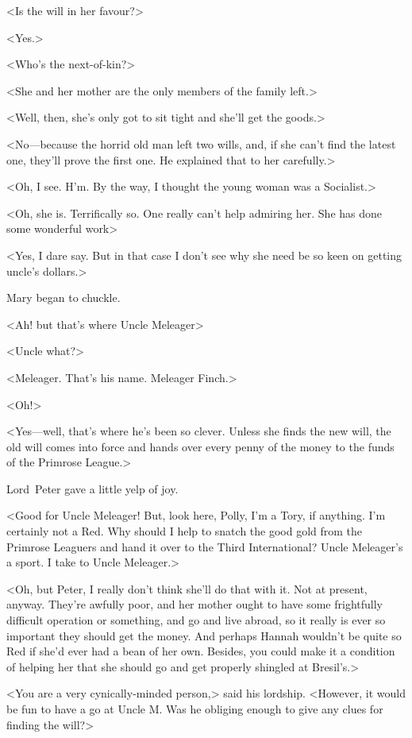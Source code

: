 <Is the will in her favour?>

<Yes.>

<Who's the next-of-kin?>

<She and her mother are the only members of the family left.>

<Well, then, she's only got to sit tight and she'll get the goods.>

<No—because the horrid old man left two wills, and, if she can't find the latest one, they'll prove the first one. He explained that to her carefully.>

<Oh, I see. H'm. By the way, I thought the young woman was a Socialist.>

<Oh, she is. Terrifically so. One really can't help admiring her. She has done some wonderful work\longdash>

<Yes, I dare say. But in that case I don't see why she need be so keen on getting uncle's dollars.>

Mary began to chuckle.

<Ah! but that's where Uncle Meleager\longdash>

<Uncle what?>

<Meleager. That's his name. Meleager Finch.>

<Oh!>

<Yes—well, that's where he's been so clever. Unless she finds the new will, the old will comes into force and hands over every penny of the money to the funds of the Primrose League.>

Lord~Peter gave a little yelp of joy.

<Good for Uncle Meleager! But, look here, Polly, I'm a Tory, if anything. I'm certainly not a Red. Why should I help to snatch the good gold from the Primrose Leaguers and hand it over to the Third International? Uncle Meleager's a sport. I take to Uncle Meleager.>

<Oh, but Peter, I really don't think she'll do that with it. Not at present, anyway. They're awfully poor, and her mother ought to have some frightfully difficult operation or something, and go and live abroad, so it really is ever so important they should get the money. And perhaps Hannah wouldn't be quite so Red if she'd ever had a bean of her own. Besides, you could make it a condition of helping her that she should go and get properly shingled at Bresil's.>

<You are a very cynically-minded person,> said his lordship. <However, it would be fun to have a go at Uncle M\@. Was he obliging enough to give any clues for finding the will?>

